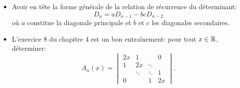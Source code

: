\begin{itemize}
    \item Avoir en tête la forme générale de la relation de récurrence du déterminant: 
    $$\boxed{D_n = aD_{n-1} - bc D_{n-2}}$$
    où $a$ constitue la diagonale principale et $b$ et $c$ les diagonales secondaires. 
    \item L'exercice 8 du chapitre 4 est un bon entraînement: pour tout $x \in \mathbb{R}$, déterminer:
    $$
        A_n(x)=\begin{vmatrix}
            2x & 1 & & 0\\
            1 & 2x & \ddots\\
             & \ddots & \ddots & 1\\
             0 & & 1 & 2x
        \end{vmatrix}.
    $$    
\end{itemize}